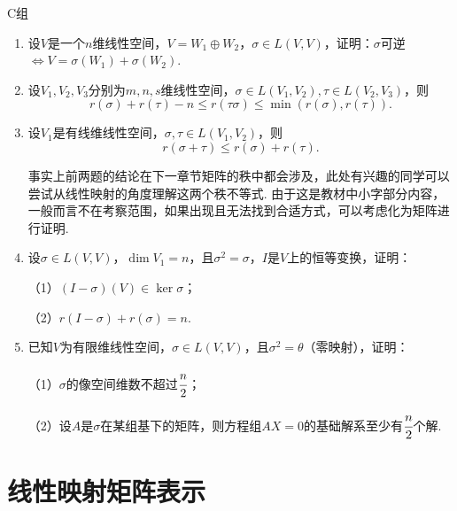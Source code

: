 \centerline{\heiti C组}
\begin{enumerate}
	\item 设$V$是一个$n$维线性空间，$V=W_1\oplus W_2$，$\sigma\in L(V,V)$，证明：$\sigma$可逆$\iff V=\sigma(W_1)+\sigma(W_2)$.
	\item 设$V_1,V_2,V_3$分别为$m,n,s$维线性空间，$\sigma\in L(V_1,V_2),\tau\in L(V_2,V_3)$，则
	$$r(\sigma)+r(\tau)-n \le r(\tau\sigma) \le \min(r(\sigma),r(\tau)).$$
	\item 设$V_1$是有线维线性空间，$\sigma,\tau\in L(V_1,V_2)$，则
	$$r(\sigma+\tau) \le r(\sigma)+r(\tau).$$
	
	事实上前两题的结论在下一章节矩阵的秩中都会涉及，此处有兴趣的同学可以尝试从线性映射的角度理解这两个秩不等式.
	由于这是教材中小字部分内容，一般而言不在考察范围，如果出现且无法找到合适方式，可以考虑化为矩阵进行证明.
	\item 设$\sigma\in L(V,V)$，$\dim V_1=n$，且$\sigma^2=\sigma$，$I$是$V$上的恒等变换，证明：
	
	（1）$(I-\sigma)(V) \in \ker\sigma$；

	（2）$r(I-\sigma)+r(\sigma)=n$.
	\item 已知$V$为有限维线性空间，$\sigma\in L(V,V)$，且$\sigma^2=\theta$（零映射），证明：
	
	（1）$\sigma$的像空间维数不超过$\cfrac{n}{2}$；

	（2）设$A$是$\sigma$在某组基下的矩阵，则方程组$AX=0$的基础解系至少有$\cfrac{n}{2}$个解.
\end{enumerate}

\section{线性映射矩阵表示}

